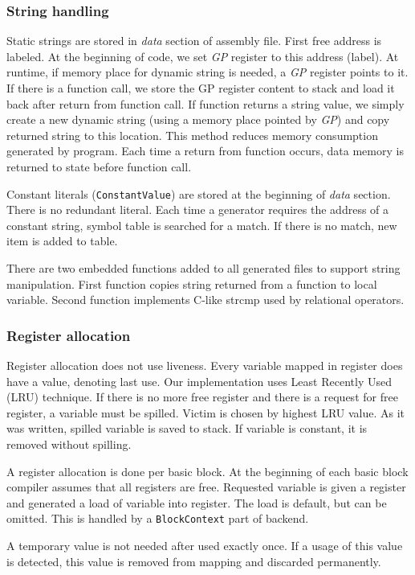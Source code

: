 \documentclass[12pt]{article}
\begin{document}
\subsubsection{String handling}
Static strings are stored in \textit{data} section of assembly file. First free address is labeled. At the beginning of code, we set \textit{GP} register to this address (label). At runtime, if memory place for dynamic string is needed, a \textit{GP} register points to it. If there is a function call, we store the GP register content to stack and load it back after return from function call. If function returns a string value, we simply create a new dynamic string (using a memory place pointed by \textit{GP}) and copy returned string to this location. This method reduces memory consumption generated by program. Each time a return from function occurs, data memory is returned to state before function call.

Constant literals (\texttt{ConstantValue}) are stored at the beginning of \textit{data} section. There is no redundant literal. Each time a generator requires the address of a constant string, symbol table is searched for a match. If there is no match, new item is added to table. 

There are two embedded functions added to all generated files to support string manipulation. First function copies string returned from a function to local variable. Second function implements C-like strcmp used by relational operators.

\subsubsection{Register allocation}
Register allocation does not use liveness. Every variable mapped in register does have a value, denoting last use. Our implementation uses Least Recently Used (LRU) technique. If there is no more free register and there is a request for free register, a variable must be spilled. Victim is chosen by highest LRU value. As it was written, spilled variable is saved to stack. If variable is constant, it is removed without spilling.

A register allocation is done per basic block. At the beginning of each basic block compiler assumes that all registers are free. Requested variable is given a register and generated a load of variable into register. The load is default, but can be omitted. This is handled by a \texttt{BlockContext} part of backend. 

A temporary value is not needed after used exactly once. If a usage of this value is detected, this value is removed from mapping and discarded permanently.
\end{document}
